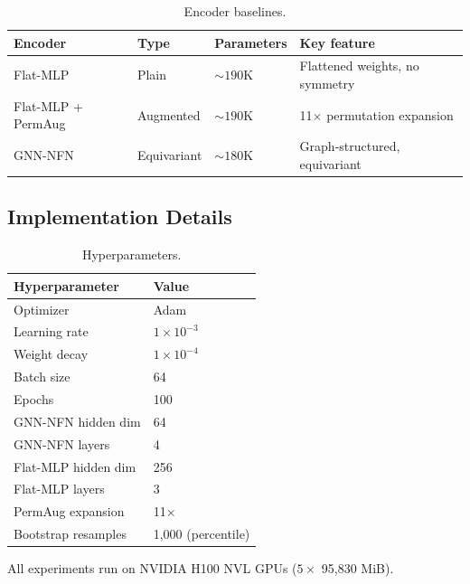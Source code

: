 \begin{table}[h]
\centering
\caption{Encoder baselines.}
\label{tab:baselines}
\begin{tabular}{llll}
\toprule
Encoder & Type & Parameters & Key feature \\
\midrule
Flat-MLP & Plain & ${\sim}190$K & Flattened weights, no symmetry \\
Flat-MLP + PermAug & Augmented & ${\sim}190$K & 11$\times$ permutation expansion \\
GNN-NFN & Equivariant & ${\sim}180$K & Graph-structured, equivariant \\
\bottomrule
\end{tabular}
\end{table}

\subsection{Implementation Details}

\begin{table}[h]
\centering
\caption{Hyperparameters.}
\label{tab:hyperparams}
\begin{tabular}{ll}
\toprule
Hyperparameter & Value \\
\midrule
Optimizer & Adam \\
Learning rate & $1{\times}10^{-3}$ \\
Weight decay & $1{\times}10^{-4}$ \\
Batch size & 64 \\
Epochs & 100 \\
GNN-NFN hidden dim & 64 \\
GNN-NFN layers & 4 \\
Flat-MLP hidden dim & 256 \\
Flat-MLP layers & 3 \\
PermAug expansion & 11$\times$ \\
Bootstrap resamples & 1,000 (percentile) \\
\bottomrule
\end{tabular}
\end{table}

All experiments run on NVIDIA H100 NVL GPUs ($5{\times}$ 95,830 MiB).
